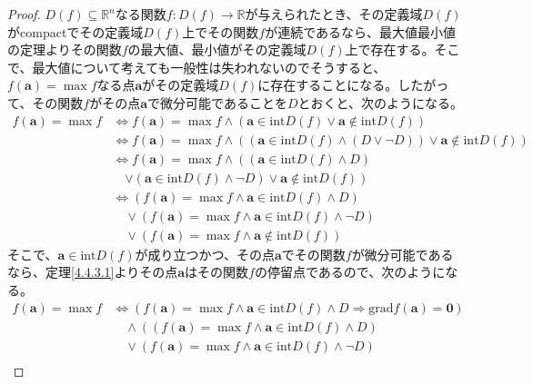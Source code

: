 \documentclass[dvipdfmx]{jsarticle}
\begin{document}
\begin{proof}
$D(f) \subseteq \mathbb{R}^{n}$なる関数$f:D(f) \rightarrow \mathbb{R}$が与えられたとき、その定義域$D(f)$がcompactでその定義域$D(f)$上でその関数$f$が連続であるなら、最大値最小値の定理よりその関数$f$の最大値、最小値がその定義域$D(f)$上で存在する。そこで、最大値について考えても一般性は失われないのでそうすると、$f\left( \mathbf{a} \right) = \max f$なる点$\mathbf{a}$がその定義域$D(f)$に存在することになる。したがって、その関数$f$がその点$\mathbf{a}$で微分可能であることを$D$とおくと、次のようになる。
\begin{align*}
f\left( \mathbf{a} \right) = \max f &\Leftrightarrow f\left( \mathbf{a} \right) = \max f \land \left( \mathbf{a} \in \mathrm{int}{D(f)} \vee \mathbf{a} \notin \mathrm{int}{D(f)} \right)\\
&\Leftrightarrow f\left( \mathbf{a} \right) = \max f \land \left( \left( \mathbf{a} \in \mathrm{int}{D(f)} \land (D \vee \neg D) \right) \vee \mathbf{a} \notin \mathrm{int}{D(f)} \right)\\
&\Leftrightarrow f\left( \mathbf{a} \right) = \max f \land \left( \left( \mathbf{a} \in \mathrm{int}{D(f)} \land D \right) \right. \\
&\quad \left. \vee \left( \mathbf{a} \in \mathrm{int}{D(f)} \land \neg D \right) \vee \mathbf{a} \notin \mathrm{int}{D(f)} \right)\\
&\Leftrightarrow \left( f\left( \mathbf{a} \right) = \max f \land \mathbf{a} \in \mathrm{int}{D(f)} \land D \right) \\
&\quad \vee \left( f\left( \mathbf{a} \right) = \max f \land \mathbf{a} \in \mathrm{int}{D(f)} \land \neg D \right) \\
&\quad \vee \left( f\left( \mathbf{a} \right) = \max f \land \mathbf{a} \notin \mathrm{int}{D(f)} \right)
\end{align*}
そこで、$\mathbf{a} \in \mathrm{int}{D(f)}$が成り立つかつ、その点$\mathbf{a}$でその関数$f$が微分可能であるなら、定理\ref{4.4.3.1}よりその点$\mathbf{a}$はその関数$f$の停留点であるので、次のようになる。
\begin{align*}
f\left( \mathbf{a} \right) = \max f &\Leftrightarrow \left( f\left( \mathbf{a} \right) = \max f \land \mathbf{a} \in \mathrm{int}{D(f)} \land D \Rightarrow \mathrm{grad}f\left( \mathbf{a} \right) = \mathbf{0} \right) \\
&\quad \land \left( \left( f\left( \mathbf{a} \right) = \max f \land \mathbf{a} \in \mathrm{int}{D(f)} \land D \right) \right. \\
&\quad \vee \left( f\left( \mathbf{a} \right) = \max f \land \mathbf{a} \in \mathrm{int}{D(f)} \land \neg D \right) \\

\end{align*}
\end{proof}
\end{document}
